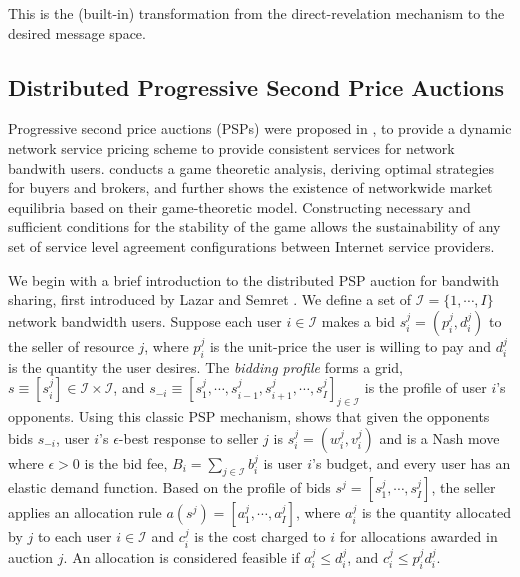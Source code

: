 \documentclass[12pt]{article}
\theoremstyle{definition}
\newcommand{\mcI}{\mathcal{I}}
\begin{document}
\begin{multicols}{2}
This is the (built-in) transformation from the
direct-revelation mechanism to the desired message space.

\subsection{Distributed Progressive Second Price Auctions}

Progressive second price auctions (PSPs) were proposed
in \cite{lazar}, \cite{diffserve} to provide a dynamic network service pricing
scheme to provide consistent services for network bandwith users.
\cite{diffserve} conducts a game theoretic analysis, deriving
optimal strategies for buyers and brokers, and further shows the existence
of networkwide market equilibria based on their game-theoretic
model. Constructing necessary and sufficient conditions for the stability
of the game allows the sustainability of any set
of service level agreement configurations between Internet service
providers.

We begin with a brief introduction to the distributed PSP auction for bandwith
sharing, first introduced by Lazar and Semret \cite{lazar}.
We define a set of $\mcI = \lbrace 1,\cdots,I\rbrace$ network bandwidth users.
Suppose each user $i \in \mcI$ makes a bid $s_i^j = (p_i^j, d_i^j)$ to the
seller of resource $j$, where $p_i^j$ is the unit-price the user is willing to
pay and $d_i^j$ is the quantity the user desires. The \emph{bidding profile} forms a grid, $s \equiv
[s_i^j] \in \mcI \times \mcI$, and $s_{-i} \equiv [s_1^j , \cdots , s_{i-1}^j , s_{i+1}^j , \cdots
, s_I^j]_{j\in\mcI}$ is the profile of user $i$'s opponents. 
Using this classic PSP mechanism, \cite{lazar} shows that given the opponents
bids $s_{-i}$,
user $i$'s $\epsilon$-best response to seller $j$ is $s_i^j = (w_i^j, v_i^j)$
and is a Nash move
where $\epsilon > 0$ is the bid fee, $B_i =\sum_{j\in\mcI} b_i^j$ is user $i$'s
budget, and every user has an elastic demand function.
Based on the profile of bids $s^j = [s^j_1, \cdots , s^j_I]$, the seller applies
an allocation rule $a(s^j) = [a_1^j, \cdots , a_I^j]$, where $a^j_i$ is the quantity allocated
by $j$ to each user $i\in\mcI$ and $c^j_i$ is the cost charged to $i$ for
allocations awarded in auction $j$. 
An allocation is considered feasible if $a^j_i \le d_i^j$, and $c^j_i \le  p^j_i d_i^j$.


\end{multicols}
\end{document}
